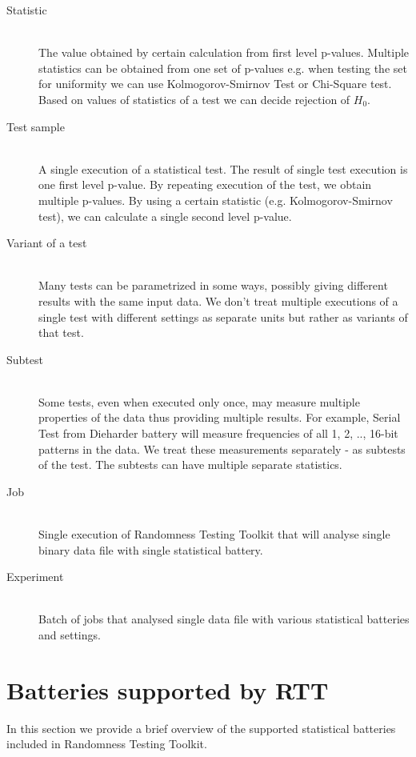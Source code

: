 \documentclass[
  digital,  	%
  color,		%
  oneside,   	%
  12pt,
  nocover,
  notable,
  nolof,
  nolot,
]{fithesis3}
\theoremstyle{definition}
\theoremstyle{remark}
\begin{document}
\begin{description}
\item[Statistic] \hfill \\
The value obtained by certain calculation from first level p-values. Multiple statistics can be obtained from one set of p-values e.g. when testing the set for uniformity we can use Kolmogorov-Smirnov Test or Chi-Square test. Based on values of statistics of a test we can decide rejection of $H_0$.

\item[Test sample] \hfill \\
A single execution of a statistical test. The result of single test execution is one first level p-value. By repeating execution of the test, we obtain multiple p-values. By using a certain statistic (e.g. Kolmogorov-Smirnov test), we can calculate a single second level p-value.

\item[Variant of a test] \hfill \\
Many tests can be parametrized in some ways, possibly giving different results with the same input data. We don't treat multiple executions of a single test with different settings as separate units but rather as variants of that test.

\item[Subtest] \hfill \\
Some tests, even when executed only once, may measure multiple properties of the data thus providing multiple results. For example, Serial Test from Dieharder battery will measure frequencies of all 1, 2, .., 16-bit patterns in the data. We treat these measurements separately - as subtests of the test. The subtests can have multiple separate statistics.

\item[Job] \hfill \\
Single execution of Randomness Testing Toolkit that will analyse single binary data file with single statistical battery.

\item[Experiment] \hfill \\
Batch of jobs that analysed single data file with various statistical batteries and settings.

\end{description}

\section{Batteries supported by RTT}
In this section we provide a brief overview of the supported statistical batteries included in Randomness Testing Toolkit.
\end{document}

